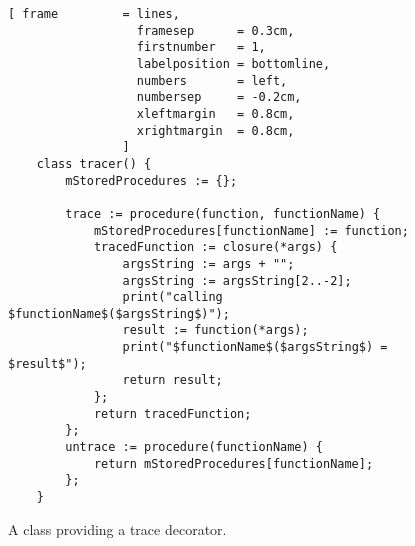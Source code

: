 \begin{figure}[!ht]
\centering
\begin{Verbatim}[ frame         = lines, 
                  framesep      = 0.3cm, 
                  firstnumber   = 1,
                  labelposition = bottomline,
                  numbers       = left,
                  numbersep     = -0.2cm,
                  xleftmargin   = 0.8cm,
                  xrightmargin  = 0.8cm,
                ]
    class tracer() {
        mStoredProcedures := {};
        
        trace := procedure(function, functionName) {
            mStoredProcedures[functionName] := function;
            tracedFunction := closure(*args) {
                argsString := args + "";
                argsString := argsString[2..-2];
                print("calling $functionName$($argsString$)");
                result := function(*args);
                print("$functionName$($argsString$) = $result$");
                return result;
            };
            return tracedFunction;
        };
        untrace := procedure(functionName) {
            return mStoredProcedures[functionName];
        };
    }
\end{Verbatim}
\vspace*{-0.3cm}
\caption{A class providing a trace decorator.}
\label{fig:trace-decorator.stlx}
\end{figure}

